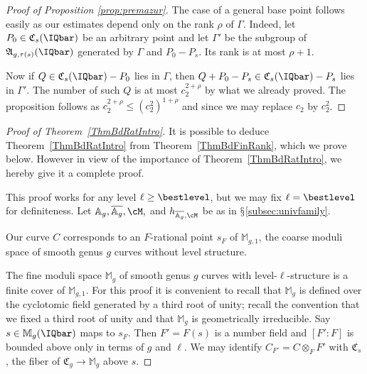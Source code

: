 \begin{proof}[Proof of Proposition \ref{prop:premazur}]
  The case of a general base point follows easily as our estimates
  depend only on the rank $\rho$ of $\Gamma$. Indeed,
  let $P_0\in \mathfrak{C}_s(\IQbar)$ be an arbitrary point and let
  $\Gamma'$ be the subgroup of $\mathfrak{A}_{g,\tau(s)}(\IQbar)$ generated by
  $\Gamma$ and $P_0-P_s$. Its rank is at most $\rho +1$.

  Now if $Q\in \mathfrak{C}_s(\IQbar)-P_0$ lies in $\Gamma$, then
  $Q+P_0-P_s\in \mathfrak{C}_s(\IQbar)-P_s$ lies in $\Gamma'$. The
  number of such $Q$ is at most $c_2^{2+\rho}$ by
  what we already proved.
  The proposition follows as $c_2^{2+\rho}\le (c_2^2)^{1+\rho}$ and
  since we may replace $c_2$ by $c_2^2$.
\end{proof}




\begin{proof}[Proof of Theorem~\ref{ThmBdRatIntro}]
  It is possible to deduce Theorem~\ref{ThmBdRatIntro} from
  Theorem~\ref{ThmBdFinRank}, which we prove below. However in view of
  the importance of Theorem~\ref{ThmBdRatIntro}, we hereby give it a
  complete proof.

  This proof works for any level $\ell\ge\bestlevel$, but we may fix
  $\ell=\bestlevel$ for definiteness. Let
  $\mathbb{A}_g,\overline{\mathbb{A}_g},\cM,$
  and $h_{\overline{\mathbb{A}_g},\cM}$ be as in $\mathsection$\ref{subsec:univfamily}.


  Our curve $C$ corresponds to an $F$-rational point $s_F$ of $\mathbb{M}_{g,1}$, the coarse
  moduli space of smooth genus $g$ curves without level structure.


  The fine moduli space $\mathbb{M}_g$ of smooth genus $g$ curves
  with level-$\ell$-structure is a finite cover of $\mathbb{M}_{g,1}$.
  For this proof it is convenient to recall that
  $\mathbb{M}_g$ is defined over
  the cyclotomic field generated by a third root of unity;
  recall the convention that we fixed a third root of unity and that
  $\mathbb{M}_g$ is geometrically irreducible.
  Say $s\in\mathbb{M}_g(\IQbar)$ maps to $s_F$. Then
  $F'=F(s)$ is a number field and
  $[F':F]$ is bounded above
  only in terms of $g$ and $\ell$. We may identify $C_{F'} = C\otimes_F F'$ with $\mathfrak{C}_s$, the
  fiber of
  $\mathfrak{C}_g\rightarrow\mathbb{M}_g$ above $s$.


\end{proof}
